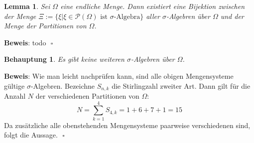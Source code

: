 \documentclass[11pt,a4paper,ngerman]{article}
\newcommand{\set}[1]{ \{ #1 \}}
\newtheorem{prop}{\bfseries Behauptung}
\newtheorem{lemma}{\bfseries Lemma}
\begin{document}
\begin{lemma}
Sei $\Omega$ eine endliche Menge. Dann existiert eine Bijektion zwischen der Menge $\Xi := \set{\xi | \xi \in \mathcal{P}(\Omega) \text{ ist $\sigma$-Algebra}}$ aller $\sigma$-Algebren über $\Omega$ und der Menge der Partitionen von $\Omega$.	
\end{lemma}

\textbf{Beweis}: todo $\mbox{}$ \hfill $\square$

\begin{prop}
 Es gibt keine weiteren $\sigma$-Algebren über $\Omega$. 
\end{prop}
\textbf{Beweis}: Wie man leicht nachprüfen kann, sind alle obigen Mengensysteme gültige $\sigma$-Algebren. Bezeichne $S_{n,k}$ die Stirlingzahl zweiter Art.
Dann gilt für die Anzahl $N$ der verschiedenen Partitionen von $\Omega$: 
\begin{equation}
N = \sum_{k=1}^4 S_{4,k} = 1 +6+ 7+ 1=15
\end{equation}
Da zusätzliche alle obenstehenden Mengensysteme paarweise verschiedenen sind, folgt die Aussage.
$\mbox{}$ \hfill $\square$
\end{document}
